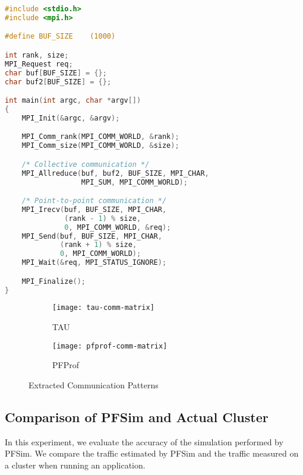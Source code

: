\begin{lstlisting}[caption={MPI Application Used for Evaluation},
                   label=lst:pfprof-example, float, language=C]
#include <stdio.h>
#include <mpi.h>

#define BUF_SIZE    (1000)

int rank, size;
MPI_Request req;
char buf[BUF_SIZE] = {};
char buf2[BUF_SIZE] = {};

int main(int argc, char *argv[])
{
    MPI_Init(&argc, &argv);

    MPI_Comm_rank(MPI_COMM_WORLD, &rank);
    MPI_Comm_size(MPI_COMM_WORLD, &size);

    /* Collective communication */
    MPI_Allreduce(buf, buf2, BUF_SIZE, MPI_CHAR,
                  MPI_SUM, MPI_COMM_WORLD);

    /* Point-to-point communication */
    MPI_Irecv(buf, BUF_SIZE, MPI_CHAR,
              (rank - 1) % size,
              0, MPI_COMM_WORLD, &req);
    MPI_Send(buf, BUF_SIZE, MPI_CHAR,
             (rank + 1) % size,
             0, MPI_COMM_WORLD);
    MPI_Wait(&req, MPI_STATUS_IGNORE);

    MPI_Finalize();
}
\end{lstlisting}


\begin{figure}
    \centering
    \begin{subfigure}{.49\linewidth}
        \centering
        \texttt{[image: tau-comm-matrix]}
        \caption{TAU}%
        \label{fig:tau-comm-matrix}
    \end{subfigure}
    \begin{subfigure}{.49\linewidth}
        \centering
        \texttt{[image: pfprof-comm-matrix]}
        \caption{PFProf}%
        \label{fig:pfprof-comm-matrix}
    \end{subfigure}
    \caption{Extracted Communication Patterns}%
    \label{fig:profiler-comparison}
\end{figure}

\subsection{Comparison of PFSim and Actual Cluster}%
\label{sec:ii-eval-pfsim}

In this experiment, we evaluate the accuracy of the simulation performed by
PFSim. We compare the traffic estimated by PFSim and the traffic measured
on a cluster when running an application.

